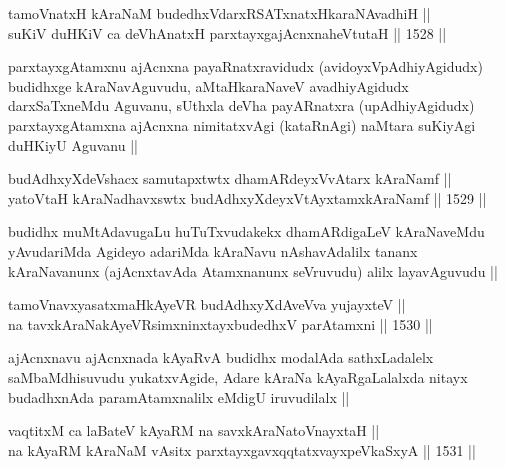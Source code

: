 
\begin{shl}
tamoVnatxH kAraNaM budedhxVdarxRSATx\s natxHkaraNAvadhiH ||  \\
suKiV duHKiV ca deVhAnatxH parxtayxgajAcnxnaheVtutaH ||  1528 ||  
\end{shl}

\begin{artha}
parxtayxgAtamxnu ajAcnxna payaRnatxravidudx (avidoyxVpAdhiyAgidudx) budidhxge kAraNavAguvudu, aMtaHkaraNaveV avadhiyAgidudx darxSaTxneMdu Aguvanu, sUthxla deVha payARnatxra (upAdhiyAgidudx) parxtayxgAtamxna ajAcnxna nimitatxvAgi (kataRnAgi) naMtara suKiyAgi duHKiyU Aguvanu ||
\end{artha}


\begin{shl}
budAdhxyXdeVshacx samutapxtwtx dhamARdeyxVvAtarx kAraNamf || \\
yatoV\s taH kAraNadhavxswtx budAdhxyXdeyxVtAyxtamxkAraNamf ||  1529 ||  
\end{shl}

\begin{artha}
budidhx muMtAdavugaLu huTuTxvudakekx dhamARdigaLeV kAraNaveMdu yAvudariMda Agideyo adariMda kAraNavu nAshavAdalilx tananx kAraNavanunx (ajAcnxtavAda Atamxnanunx seVruvudu) alilx layavAguvudu ||
\end{artha}


\begin{shl}
tamoVnavxyasatxmaHkAyeVR budAdhxyXdAveVva yujayxteV || \\
na tavxkAraNakAyeVR\s simxninxtayxbudedhxV parAtamxni ||  1530 ||  
\end{shl}

\begin{artha}
ajAcnxnavu ajAcnxnada kAyaRvA budidhx modalAda sathxLadalelx saMbaMdhisuvudu yukatxvAgide, Adare kAraNa kAyaRgaLalalxda nitayx budadhxnAda paramAtamxnalilx eMdigU iruvudilalx ||
\end{artha}

\begin{shl}
vaqtitxM ca laBateV kAyaRM na savxkAraNatoV\s nayxtaH ||  \\
na kAyaRM kAraNaM vA\s sitx parxtayxgavxqqtatxvayxpeVkaSxyA ||  1531 ||  
\end{shl}

